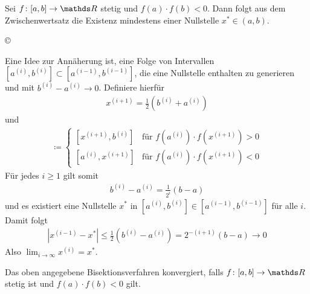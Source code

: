 Sei $f\colon[a,b]\to\R $ stetig und $f(a) \cdot f(b) <0$.
Dann folgt aus dem Zwischenwertsatz die Existenz
mindestens einer Nullstelle $x^{*}\in (a,b)$.
\begin{image}{\copyright}
\end{image}\label{im5.1.2}
Eine Idee zur Annäherung ist, eine Folge von Intervallen
$[a^{(i)}, b^{(i)}]\subset  [a^{(i-1)}, b^{(i-1)}] $,
die eine Nullstelle enthalten zu generieren
und mit $b^{(i)}-a^{(i)} \to 0$.
Definiere hierfür
\begin{gather}
  x^{(i+1)}= \frac{1}{2}(b^{(i)}+a^{(i)})
  \label{V.1.1}
\end{gather}
und
\begin{gather}
  [a^{(i+1)}, b^{(i+1)}] \coloneqq \begin{cases}
    [x^{(i+1)}, b^{(i)}] & \text{für } f(a^{(i)})\cdot f(x^{(i+1)}) > 0 \\
    [a^{(i)}, x^{(i+1)}] & \text{für } f(a^{(i)})\cdot f(x^{(i+1)}) < 0
  \end{cases}
  \label{V.1.2}
\end{gather}
Für jedes $i\geq 1$ gilt somit
\begin{gather*}
  b^{(i)}-a^{(i)} = \frac{1}{2^i}(b-a)
\end{gather*}
und es existiert eine Nullstelle $x^{*}$ in 
$[a^{(i)}, b^{(i)}]\in [a^{(i-1)}, b^{(i-1)}]$ für alle $i$.
Damit folgt
\begin{gather*}
  |x^{(i-1)}-x^{*}| \leq \frac{1}{2}(b^{(i)}-a^{(i)}) 
  =  2^{-(i+1)} (b-a) \to 0
\end{gather*}
Also $\lim_{i\to \infty}x^{(i)} = x^{*}$.


\begin{Kore}
  Das oben angegebene Bisektionsverfahren konvergiert, falls
  $f\colon[a,b]\to\R $ stetig ist und 
  $f(a)\cdot f(b) <0$ gilt.
\end{Kore}

